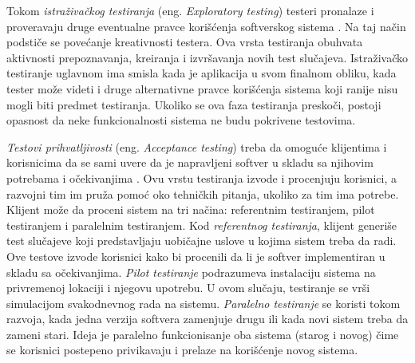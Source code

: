 \documentclass[12pt,oneside]{memoir}
\begin{document}
Tokom \emph{istraživačkog testiranja} (eng. \textit{Exploratory testing}) testeri pronalaze i proveravaju druge eventualne pravce korišćenja softverskog sistema \cite{ExploratoryTesting}. Na taj način podstiče se povećanje kreativnosti testera. Ova vrsta testiranja obuhvata aktivnosti prepoznavanja, kreiranja i izvršavanja novih test slučajeva. Istraživačko testiranje uglavnom ima smisla kada je aplikacija u svom finalnom obliku, kada tester može videti i druge alternativne pravce korišćenja sistema koji ranije nisu mogli biti predmet testiranja. Ukoliko se ova faza testiranja preskoči, postoji opasnost da neke funkcionalnosti sistema ne budu pokrivene testovima.
\par 


\emph{Testovi prihvatljivosti} (eng. \textit{Acceptance testing}) 
treba da omoguće klijentima i korisnicima da se sami uvere da je napravljeni softver u skladu sa njihovim potrebama i očekivanjima \cite{AcceptanceTesting}.
Ovu vrstu testiranja izvode i procenjuju korisnici, a razvojni tim im pruža pomoć oko tehničkih pitanja, ukoliko za tim ima potrebe.
Klijent može da proceni sistem na tri načina: referentnim testiranjem, pilot testiranjem i paralelnim testiranjem. Kod \emph{referentnog testiranja}, klijent generiše test slučajeve koji predstavljaju uobičajne uslove u kojima sistem treba da radi. Ove testove izvode korisnici kako bi procenili da li je softver implementiran u skladu sa očekivanjima. \emph{Pilot testiranje} podrazumeva instalaciju sistema na privremenoj lokaciji i njegovu upotrebu. U ovom slučaju, testiranje se vrši simulacijom svakodnevnog rada na sistemu.
\emph{Paralelno testiranje} se koristi tokom razvoja, kada jedna verzija softvera zamenjuje drugu ili kada novi sistem treba da zameni stari. 
Ideja je paralelno funkcionisanje oba sistema (starog i novog) čime se korisnici postepeno privikavaju i prelaze na korišćenje novog sistema.
\par 
\end{document}
